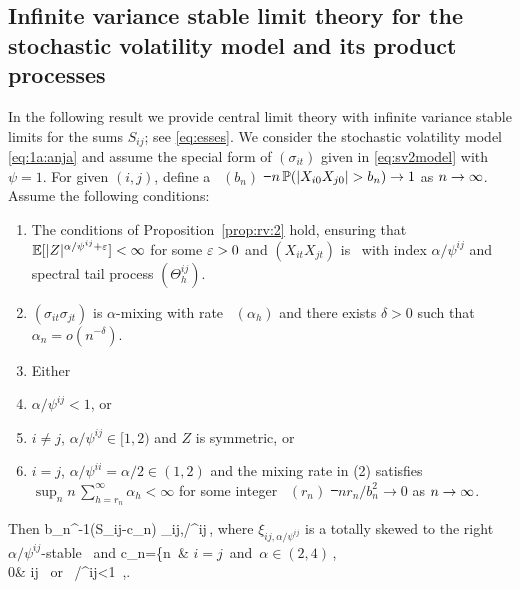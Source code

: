 \subsection{Infinite variance stable limit theory for the stochastic volatility model and its product processes}\label{subsec:limit2}
In the following result we provide central limit theory with infinite variance stable limits for the sums $S_{ij}$; see \eqref{eq:esses}.
\bth\label{thm:1}
We consider the stochastic volatility model \eqref{eq:1a:anja} and assume the special form of $(\sigma_{it})$ given in \eqref{eq:sv2model} with $\psi=1$. 
For given $(i,j)$, define a \seq\ $(b_n)$ \st\ 
$n\,\P(|X_{i0}X_{j0}|>b_n)\to 1$ as $n\to\infty$.
Assume the following conditions:
\begin{enumerate}
\item 
The conditions of Proposition~\ref{prop:rv:2} hold, ensuring that ${\mathbb E}[|Z|^{\alpha/\psi^{ij}+\varepsilon}]<\infty$ for some $\varepsilon>0$ and
$(X_{it}X_{jt})$ is \regvary\ with index $\alpha/\psi^{ij}$ and spectral tail process $(\Theta_h^{ij})$.
\item
$(\sigma_{it}\sigma_{jt})$ is $\alpha$-mixing with rate \fct\ $(\alpha_h)$ and there exists $\delta>0$ such that $\alpha_n=o(n^{-\delta})$.
\item Either 
\item[(i)]$\alpha/\psi^{ij}< 1$, or 
\item[(ii)] 
$i\ne j$, $\alpha/\psi^{ij}\in [1,2)$ and $Z$ is symmetric, or 
\item[(iii)] $i=j$,
$\alpha/\psi^{ii}=\alpha/2 \in (1,2)$ and the mixing rate in (2)
satisfies 
$\sup _n n\,\sum_{h=r_n}^\infty \alpha_h<\infty$ for some integer \seq\ $(r_n)$ \st\ $nr_n/b_n^2\to 0$ as $n\to\infty$.
\end{enumerate}
Then 
\beam\label{eq:rra}
b_n^{-1}(S_{ij}-c_n) \std \xi_{ij,\alpha/\psi^{ij}}\,,
\eeam
where $\xi_{ij,\alpha/\psi^{ij}}$ is a totally skewed to the right $\alpha/\psi^{ij}$-stable \rv\ and 
\beao
c_n=\left\{n\, \E [X^2]& \mbox{$i=j$ and $\alpha\in (2,4)$}\,,\\
0& i\ne j \mbox{ or } \alpha/\psi^{ij}<1 \,,\earr\right.
\eeao
\ethe
\bre\label{reM:c1}
